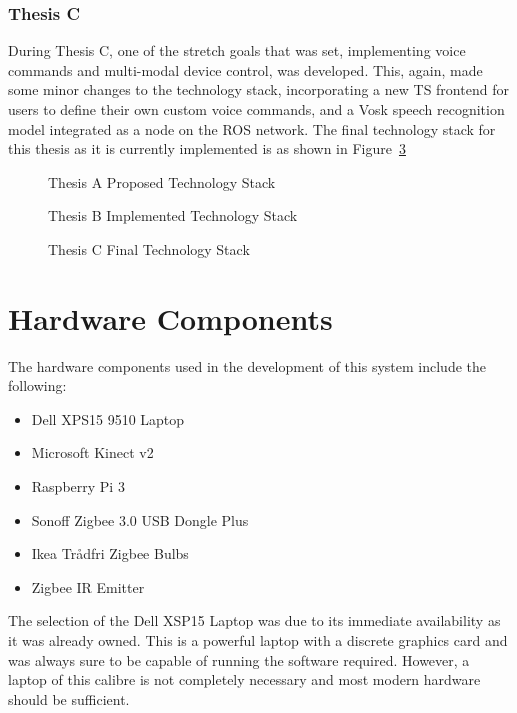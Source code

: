 \subsubsection{Thesis C}
During Thesis C, one of the stretch goals that was set, implementing voice commands and multi-modal device control, was developed.
This, again, made some minor changes to the technology stack, incorporating a new TS frontend for users to define their own custom voice commands, and a Vosk speech recognition model integrated as a node on the ROS network.
The final technology stack for this thesis as it is currently implemented is as shown in Figure~\ref{fig:tech_stack_thesis_c}

\begin{figure}[H]
    \caption{Thesis A Proposed Technology Stack}
    \label{fig:tech_stack_thesis_a}
\end{figure}

\begin{figure}[H]
    \caption{Thesis B Implemented Technology Stack}
    \label{fig:tech_stack_thesis_b}
\end{figure}

\begin{figure}[H]
    \caption{Thesis C Final Technology Stack}
    \label{fig:tech_stack_thesis_c}
\end{figure}

\section{Hardware Components}
The hardware components used in the development of this system include the following:
\begin{itemize}
    \item Dell XPS15 9510 Laptop
    \item Microsoft Kinect v2
    \item Raspberry Pi 3
    \item Sonoff Zigbee 3.0 USB Dongle Plus
    \item Ikea Trådfri Zigbee Bulbs
    \item Zigbee IR Emitter
\end{itemize}

The selection of the Dell XSP15 Laptop was due to its immediate availability as it was already owned.
This is a powerful laptop with a discrete graphics card and was always sure to be capable of running the software required.
However, a laptop of this calibre is not completely necessary and most modern hardware should be sufficient.


